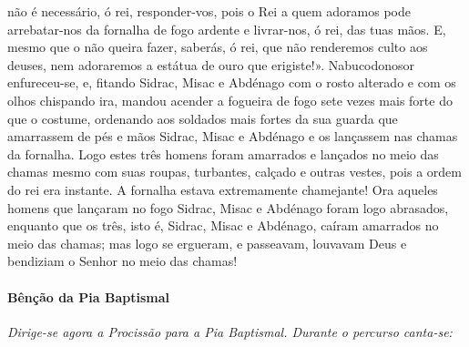 \begin{paracol}{2}
{não é necessário, ó rei, responder-vos, pois o Rei a quem adoramos pode arrebatar-nos da fornalha de fogo ardente e livrar-nos, ó rei, das tuas mãos. E, mesmo que o não queira fazer, saberás, ó rei, que não renderemos culto aos deuses, nem adoraremos a estátua de ouro que erigiste!». Nabucodonosor enfureceu-se, e, fitando Sidrac, Misac e Abdénago com o rosto alterado e com os olhos chispando ira, mandou acender a fogueira de fogo sete vezes mais forte do que o costume, ordenando aos soldados mais fortes da sua guarda que amarrassem de pés e mãos Sidrac, Misac e Abdénago e os lançassem nas chamas da fornalha. Logo estes três homens foram amarrados e lançados no meio das chamas mesmo com suas roupas, turbantes, calçado e outras vestes, pois a ordem do rei era instante. A fornalha estava extremamente chamejante! Ora aqueles homens que lançaram no fogo Sidrac, Misac e Abdénago foram logo abrasados, enquanto que os três, isto é, Sidrac, Misac e Abdénago, caíram amarrados no meio das chamas; mas logo se ergueram, e passeavam, louvavam Deus e bendiziam o Senhor no meio das chamas!
}\switchcolumn*{}\switchcolumn{}\switchcolumn*{}\switchcolumn{}\switchcolumn*{}\switchcolumn{}\switchcolumn*{}\switchcolumn{}\end{paracol}

\paragraph{Bênção da Pia Baptismal}\label{piabaptismal}

\textit{Dirige-se agora a Procissão para a Pia Baptismal. Durante o percurso canta-se:}


